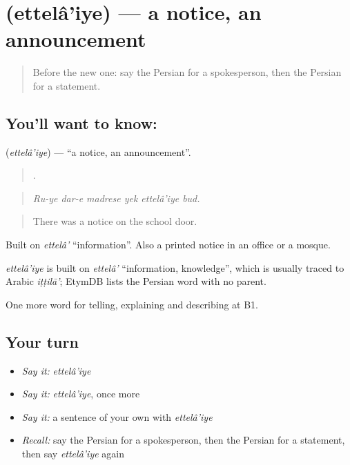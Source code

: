 \section[\texorpdfstring{\fa{اطلاعیه} (ettelâ'iye)}{اطلاعیه (ettelâ'iye)}]{ (ettelâ'iye) — a notice, an announcement}

\label{lesson:FA-C309-ettelaiye}



\begin{quote}
Before the new one: say the Persian for a spokesperson, then the Persian for a statement.
\end{quote}

\subsection*{You'll want to know: }
\textbf{} (\emph{ettelâ'iye}) — \textquotedblleft{}a notice, an announcement\textquotedblright{}.

\begin{quote}
     .
\end{quote}

\begin{quote}
\emph{Ru-ye dar-e madrese yek ettelâ'iye bud.}
\end{quote}

\begin{quote}
There was a notice on the school door.
\end{quote}

Built on \emph{ettelâ'} \textquotedblleft{}information\textquotedblright{}. Also a printed notice in an office or a mosque.

\begin{cousinweb}
\emph{ettelâ'iye} is built on \emph{ettelâ'} \textquotedblleft{}information, knowledge\textquotedblright{}, which is usually traced to Arabic \emph{iṭṭilā'}; EtymDB lists the Persian word with no parent.
\end{cousinweb}

\begin{grammarlens}[title={What you've built}]
One more word for telling, explaining and describing at B1.
\end{grammarlens}

\subsection*{Your turn}
\begin{itemize}
\raggedright
  \item \emph{Say it:} \emph{ettelâ'iye}
  \item \emph{Say it:} \emph{ettelâ'iye}, once more
  \item \emph{Say it:} a sentence of your own with \emph{ettelâ'iye}
  \item \emph{Recall:} say the Persian for a spokesperson, then the Persian for a statement, then say \emph{ettelâ'iye} again
\end{itemize}

